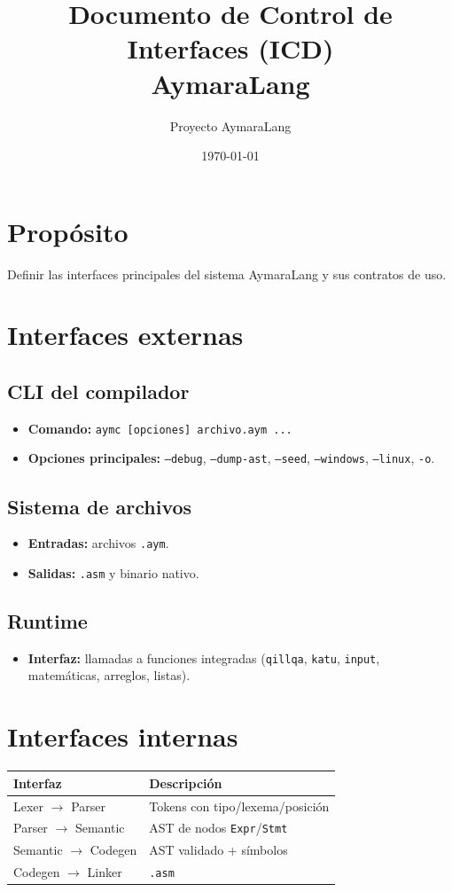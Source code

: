 \documentclass[11pt,a4paper]{article}
\title{Documento de Control de Interfaces (ICD)\\AymaraLang}
\author{Proyecto AymaraLang}
\date{\today}
\begin{document}
\maketitle

\section{Propósito}
Definir las interfaces principales del sistema AymaraLang y sus contratos de uso.

\section{Interfaces externas}
\subsection{CLI del compilador}
\begin{itemize}
    \item \textbf{Comando:} \texttt{aymc [opciones] archivo.aym ...}
    \item \textbf{Opciones principales:} \texttt{--debug}, \texttt{--dump-ast}, \texttt{--seed}, \texttt{--windows}, \texttt{--linux}, \texttt{-o}.
\end{itemize}

\subsection{Sistema de archivos}
\begin{itemize}
    \item \textbf{Entradas:} archivos \texttt{.aym}.
    \item \textbf{Salidas:} \texttt{.asm} y binario nativo.
\end{itemize}

\subsection{Runtime}
\begin{itemize}
    \item \textbf{Interfaz:} llamadas a funciones integradas (\texttt{qillqa}, \texttt{katu}, \texttt{input}, matemáticas, arreglos, listas).
\end{itemize}

\section{Interfaces internas}
\begin{longtable}{@{}p{4cm}p{9cm}@{}}
\toprule
\textbf{Interfaz} & \textbf{Descripción} \\ \midrule
Lexer $\rightarrow$ Parser & Tokens con tipo/lexema/posición \\
Parser $\rightarrow$ Semantic & AST de nodos \texttt{Expr}/\texttt{Stmt} \\
Semantic $\rightarrow$ Codegen & AST validado + símbolos \\
Codegen $\rightarrow$ Linker & \texttt{.asm} \\ \bottomrule
\end{longtable}
\end{document}
